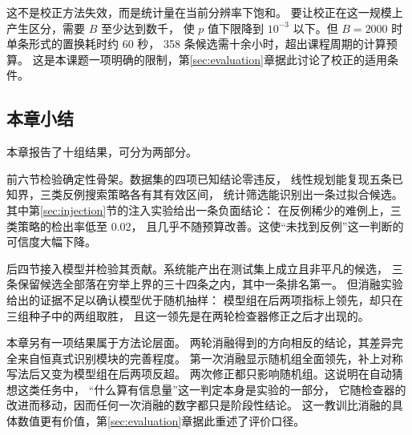 这不是校正方法失效，而是统计量在当前分辨率下饱和。
要让校正在这一规模上产生区分，需要 $B$ 至少达到数千，
使 $p$ 值下限降到 $10^{-3}$ 以下。但 $B = 2000$ 时单条形式的置换耗时约 60 秒，
358 条候选需十余小时，超出课程周期的计算预算。
这是本课题一项明确的限制，第\ref{sec:evaluation}章据此讨论了校正的适用条件。

\subsection{本章小结}

本章报告了十组结果，可分为两部分。

前六节检验确定性骨架。数据集的四项已知结论零违反，
线性规划能复现五条已知界，三类反例搜索策略各有其有效区间，
统计筛选能识别出一条过拟合候选。
其中第\ref{sec:injection}节的注入实验给出一条负面结论：
在反例稀少的难例上，三类策略的检出率低至 0.02，
且几乎不随预算改善。这使“未找到反例”这一判断的可信度大幅下降。

后四节接入模型并检验其贡献。系统能产出在测试集上成立且非平凡的候选，
三条保留候选全部落在穷举上界的三十四条之内，其中一条排名第一。
但消融实验给出的证据不足以确认模型优于随机抽样：
模型组在后两项指标上领先，却只在三组种子中的两组取胜，
且这一领先是在两轮检查器修正之后才出现的。

本章另有一项结果属于方法论层面。
两轮消融得到的方向相反的结论，其差异完全来自恒真式识别模块的完善程度。
第一次消融显示随机组全面领先，补上对称写法后又变为模型组在后两项反超。
两次修正都只影响随机组。这说明在自动猜想这类任务中，
“什么算有信息量”这一判定本身是实验的一部分，
它随检查器的改进而移动，因而任何一次消融的数字都只是阶段性结论。
这一教训比消融的具体数值更有价值，第\ref{sec:evaluation}章据此重述了评价口径。
